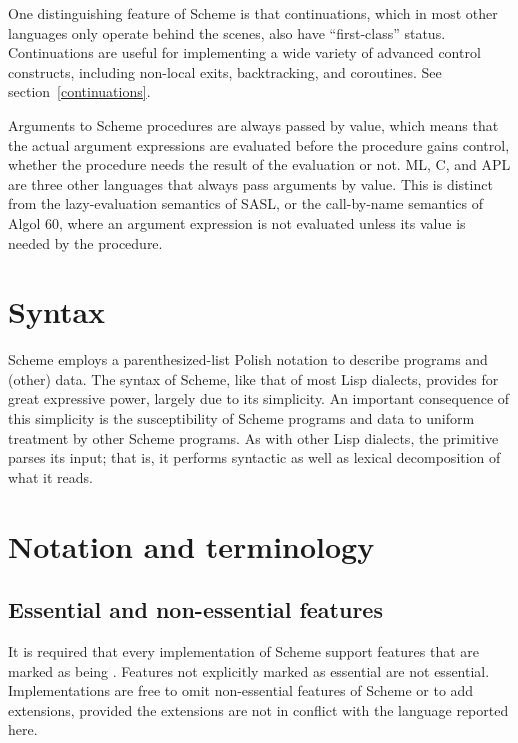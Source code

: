 \vest One distinguishing feature of Scheme is that continuations, which
in most other languages only operate behind the scenes, also have
``first-class'' status.  Continuations are useful for implementing a
wide variety of advanced control constructs, including non-local exits,
backtracking, and coroutines.  See section~\ref{continuations}.

\vest Arguments to Scheme procedures are always passed by value, which
means that the actual argument expressions are evaluated before the
procedure gains control, whether the procedure needs the result of the
evaluation or not.  ML, C, and APL are three other languages that always
pass arguments by value.
This is distinct from the lazy-evaluation semantics of SASL,
or the call-by-name semantics of Algol 60, where an argument
expression is not evaluated unless its value is needed by the
procedure.



\section{Syntax}

Scheme employs a parenthesized-list Polish notation to describe programs
and (other) data.  The syntax of Scheme, like that of most Lisp
dialects, provides for great expressive power, largely due to its
simplicity.  An important consequence of this simplicity is the
susceptibility of Scheme programs and data to uniform treatment by other
Scheme programs.  As with other Lisp dialects, the  primitive
parses its input; that is, it performs syntactic as well as lexical
decomposition of what it reads.


\section{Notation and terminology}


\subsection{Essential and non-essential features}

\label{essentialsection}
It is required that every implementation of Scheme support
features that are marked as being .  Features not
explicitly marked as essential are not essential.  Implementations are
free to omit non-essential features of Scheme or to add extensions,
provided the extensions are not in conflict with the language reported
here.


